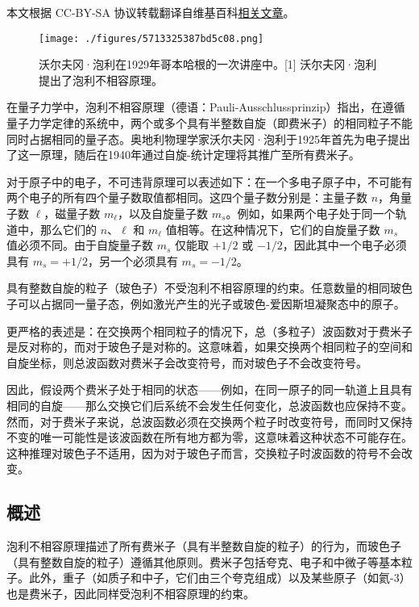 
本文根据 CC-BY-SA 协议转载翻译自维基百科\href{https://en.wikipedia.org/wiki/Pauli_exclusion_principle}{相关文章}。

\begin{figure}[ht]
\centering
\texttt{[image: ./figures/5713325387bd5c08.png]}
\caption{沃尔夫冈·泡利在1929年哥本哈根的一次讲座中。[1] 沃尔夫冈·泡利提出了泡利不相容原理。} \label{fig_PLBXR_1}
\end{figure}

在量子力学中，泡利不相容原理（德语：Pauli-Ausschlussprinzip）指出，在遵循量子力学定律的系统中，两个或多个具有半整数自旋（即费米子）的相同粒子不能同时占据相同的量子态。奥地利物理学家沃尔夫冈·泡利于1925年首先为电子提出了这一原理，随后在1940年通过自旋-统计定理将其推广至所有费米子。

对于原子中的电子，不可违背原理可以表述如下：在一个多电子原子中，不可能有两个电子的所有四个量子数取值都相同。这四个量子数分别是：主量子数 \( n \)，角量子数 \( \ell \)，磁量子数 \( m_\ell \)，以及自旋量子数 \( m_s \)。例如，如果两个电子处于同一个轨道中，那么它们的 \( n \)、\( \ell \) 和 \( m_\ell \) 值相等。在这种情况下，它们的自旋量子数 \( m_s \) 值必须不同。由于自旋量子数 \( m_s \) 仅能取 \( +1/2 \) 或 \( -1/2\)，因此其中一个电子必须具有 \( m_s = +1/2 \)，另一个必须具有 \( m_s = -1/2 \)。

具有整数自旋的粒子（玻色子）不受泡利不相容原理的约束。任意数量的相同玻色子可以占据同一量子态，例如激光产生的光子或玻色-爱因斯坦凝聚态中的原子。  

更严格的表述是：在交换两个相同粒子的情况下，总（多粒子）波函数对于费米子是反对称的，而对于玻色子是对称的。这意味着，如果交换两个相同粒子的空间和自旋坐标，则总波函数对费米子会改变符号，而对玻色子不会改变符号。

因此，假设两个费米子处于相同的状态——例如，在同一原子的同一轨道上且具有相同的自旋——那么交换它们后系统不会发生任何变化，总波函数也应保持不变。然而，对于费米子来说，总波函数必须在交换两个粒子时改变符号，而同时又保持不变的唯一可能性是该波函数在所有地方都为零，这意味着这种状态不可能存在。这种推理对玻色子不适用，因为对于玻色子而言，交换粒子时波函数的符号不会改变。
\subsection{概述}  
泡利不相容原理描述了所有费米子（具有半整数自旋的粒子）的行为，而玻色子（具有整数自旋的粒子）遵循其他原则。费米子包括夸克、电子和中微子等基本粒子。此外，重子（如质子和中子，它们由三个夸克组成）以及某些原子（如氦-3）也是费米子，因此同样受泡利不相容原理的约束。  

